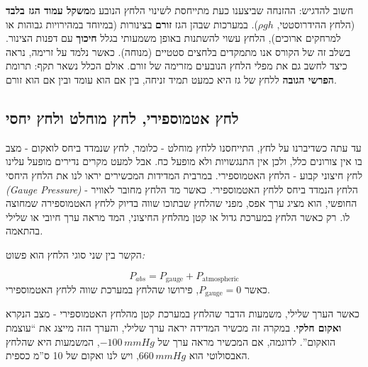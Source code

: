 \documentclass[
  hebrew,
  letterpaper,
  DIV=11,
  numbers=noendperiod]{scrreprt}
\begin{document}
\begin{tcolorbox}[enhanced jigsaw, colback=white, arc=.35mm, coltitle=black, breakable, toptitle=1mm, leftrule=.75mm, colbacktitle=quarto-callout-warning-color!10!white, opacitybacktitle=0.6, bottomtitle=1mm, titlerule=0mm, opacityback=0, colframe=quarto-callout-warning-color-frame, title=\textcolor{quarto-callout-warning-color}{\faExclamationTriangle}\hspace{0.5em}{ומה קורה כשהזורמים בתנועה?}, rightrule=.15mm, bottomrule=.15mm, toprule=.15mm, left=2mm]

חשוב להדגיש: ההזנחה שביצענו כעת מתייחסת לשינוי הלחץ הנובע מ\textbf{משקל
עמוד הגז בלבד} (הלחץ ההידרוסטטי, \(\rho g h\)). במערכות שבהן הגז
\textbf{זורם} בצינורות (במיוחד במהירויות גבוהות או למרחקים ארוכים), הלחץ
עשוי להשתנות באופן משמעותי בגלל \textbf{חיכוך} עם דפנות הצינור. בשלב זה
של הקורס אנו מתמקדים בלחצים סטטיים (מנוחה). כאשר נלמד על זרימה, נראה
כיצד לחשב גם את מפלי הלחץ הנובעים מזרימה של זורם. אולם הכלל נשאר תקף:
תרומת \textbf{הפרשי הגובה} ללחץ של גז היא כמעט תמיד זניחה, בין אם הוא
עומד ובין אם הוא זורם.

\end{tcolorbox}

\subsection{\texorpdfstring{{לחץ אטמוספירי, לחץ מוחלט ולחץ
יחסי}}{לחץ אטמוספירי, לחץ מוחלט ולחץ יחסי}}\label{ux5dcux5d7ux5e5-ux5d0ux5d8ux5deux5d5ux5e1ux5e4ux5d9ux5e8ux5d9-ux5dcux5d7ux5e5-ux5deux5d5ux5d7ux5dcux5d8-ux5d5ux5dcux5d7ux5e5-ux5d9ux5d7ux5e1ux5d9}

{עד עתה כשדיברנו על לחץ, התייחסנו ללחץ מוחלט - כלומר, לחץ שנמדד ביחס
לואקום - מצב בו אין צורונים כלל, ולכן אין התנגשויות ולא מופעל כח. אבל
למעט מקרים נדירים מופעל עלינו לחץ חיצוני קבוע - הלחץ האטמוספירי. במרבית
המדידות המכשירים יראו לנו את הלחץ היחסי} \emph{(Gauge Pressure)} {- הלחץ
הנמדד ביחס ללחץ האטמוספירי}\emph{.} {כאשר מד הלחץ מחובר לאוויר החופשי,
הוא מציג ערך אפס, מפני שהלחץ שבתוכו שווה בדיוק ללחץ האטמוספירה שמחוצה
לו}\emph{.} {רק כאשר הלחץ במערכת גדול או קטן מהלחץ החיצוני, המד מראה ערך
חיובי או שלילי בהתאמה}\emph{.}

{הקשר בין שני סוגי הלחץ הוא פשוט}\emph{:}

\[P_{abs} = P_{\text{gauge}} + P_{\text{atmospheric}}\] {כאשר}
\(P_{\text{gauge}} = 0\), {פירושו שהלחץ במערכת שווה ללחץ האטמוספירי}.

כאשר הערך שלילי, משמעות הדבר שהלחץ במערכת קטן מהלחץ האטמוספירי - מצב
הנקרא \textbf{ואקום חלקי}. במקרה זה מכשיר המדידה יראה ערך שלילי, והערך
הזה מייצג את ``עוצמת הואקום''. לדוגמה, אם המכשיר מראה ערך של
\(-100\,mmHg\), המשמעות היא שהלחץ האבסולוטי הוא \(660\,mmHg\), ויש לנו
ואקום של 10 ס''מ כספית.
\end{document}
